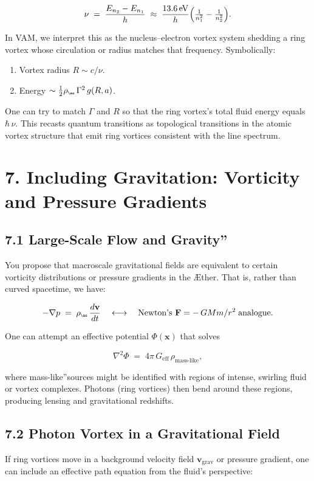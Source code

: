 \[
 \nu \;=\; \frac{E_{n_2}-E_{n_1}}{h} \;\approx\; \frac{13.6\,\mathrm{eV}}{h} \Bigl(\tfrac{1}{n_1^2}-\tfrac{1}{n_2^2}\Bigr).
\]

In VAM, we interpret this as the nucleus–electron vortex system shedding a ring vortex whose circulation or radius matches that frequency. Symbolically:

\begin{enumerate}
 \item Vortex radius \(R \sim c/\nu\).
 \item Energy \(\sim \tfrac12 \rho_{\scriptscriptstyle\mathrm{\ae}}\,\Gamma^2\,g(R,a)\).
\end{enumerate}

One can try to match \(\Gamma\) and \(R\) so that the ring vortex's total fluid energy equals \(\hbar\,\nu\). This recasts quantum transitions as topological transitions in the atomic vortex structure that emit ring vortices consistent with the line spectrum.

\section*{7. Including Gravitation: Vorticity and Pressure Gradients}
\subsection*{7.1 Large-Scale Flow and \grqq Gravity\textquotedblright}
You propose that macroscale gravitational fields are equivalent to certain vorticity distributions or pressure gradients in the Æther. That is, rather than curved spacetime, we have:

\[
 -\nabla p \;=\; \rho_{\scriptscriptstyle \mathrm{\ae}}\, \frac{d\mathbf{v}}{dt} \quad\longleftrightarrow\quad \text{Newton's } \mathbf{F}=-\,GMm/r^2\;\text{analogue}.
\]

One can attempt an effective potential \(\Phi(\mathbf{x})\) that solves

\[
 \nabla^2 \Phi \;=\; 4\pi\,G_\text{eff}\,\rho_\text{mass-like},
\]

where \grqq mass-like\textquotedblright sources might be identified with regions of intense, swirling fluid or vortex complexes. Photons (ring vortices) then bend around these regions, producing lensing and gravitational redshifts.

\subsection*{7.2 Photon Vortex in a Gravitational Field}
If ring vortices move in a background velocity field \(\mathbf{v}_{\mathrm{grav}}\) or pressure gradient, one can include an effective path equation from the fluid's perspective:

